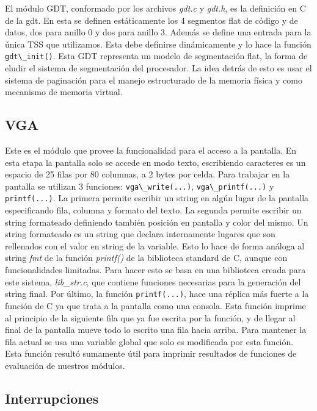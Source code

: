 \documentclass[a4paper]{article}
\newcommand{\file}[1]{\textit{#1}}
\newcommand{\func}[1]{\lstinline{#1}}
\begin{document}
El módulo GDT, conformado por los archivos \file{gdt.c} y \file{gdt.h}, es la definición en C de la gdt. En esta se definen estáticamente los 4 segmentos flat de código y de datos, dos para anillo 0 y dos para anillo 3. Además se define una entrada para la única TSS que utilizamos. Esta debe definirse dinámicamente y lo hace la función \func{gdt\_init()}. Esta GDT representa un modelo de segmentación flat, la forma de eludir el sistema de segmentación del procesador. La idea detrás de esto es usar el sistema de paginación para el manejo estructurado de la memoria física y como mecanismo de memoria virtual. 

\subsection{VGA}

Este es el módulo que provee la funcionalidad para el acceso a la pantalla. En esta etapa la pantalla solo se accede en modo texto, escribiendo caracteres es un espacio de 25 filas por 80 columnas, a 2 bytes por celda. Para trabajar en la pantalla se utilizan 3 funciones: \func{vga\_write(...)}, \func{vga\_printf(...)} y \func{printf(...)}. La primera permite escribir un string en algún lugar de la pantalla especificando fila, columna y formato del texto. La segunda permite escribir un string formateado definiendo también posición en pantalla y color del mismo. Un string formateado es un string que declara internamente lugares que son rellenados con el valor en string de la variable. Esto lo hace de forma análoga al string \emph{fmt} de la función \emph{printf()} de la biblioteca standard de C, aunque con funcionalidades limitadas. Para hacer esto se basa en una biblioteca creada para este sistema, \file{lib\_str.c}, que contiene funciones necesarias para la generación del string final. Por último, la función \func{printf(...)}, hace una réplica más fuerte a la función de C ya que trata a la pantalla como una consola. Esta función imprime al principio de la siguiente fila que ya fue escrita por la función, y de llegar al final de la pantalla mueve todo lo escrito una fila hacia arriba. Para mantener la fila actual se usa una variable global que solo es modificada por esta función. Esta función resultó sumamente útil para imprimir resultados de funciones de evaluación de nuestros módulos.

\subsection{Interrupciones}
\end{document}

